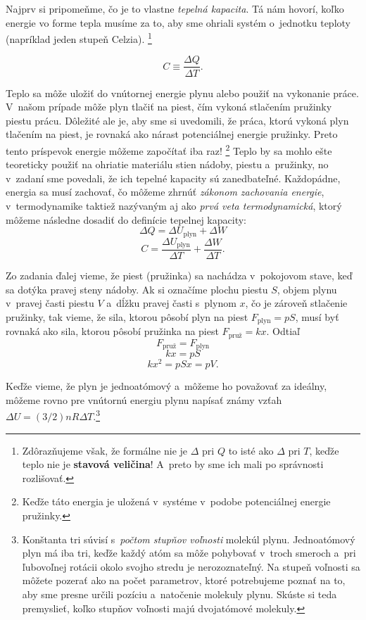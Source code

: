 Najprv si pripomeňme, čo je to vlastne \emph{tepelná kapacita}.
Tá nám hovorí, koľko energie vo forme tepla musíme  za to, aby sme ohriali systém o~jednotku teploty (napríklad jeden stupeň Celzia).%
\footnote{Zdôrazňujeme však, že formálne nie je $\Delta$ pri $Q$ to isté ako $\Delta$ pri $T$, keďže teplo nie je \textbf{stavová veličina}!
A~preto by sme ich mali po správnosti rozlišovať.}

$$C \equiv \frac{\Delta Q}{\Delta T} \text{.}$$

Teplo sa môže uložiť do vnútornej energie plynu alebo použiť na vykonanie práce. V~našom prípade môže plyn tlačiť na piest,
čím vykoná stlačením pružinky piestu prácu. Dôležité ale je, aby sme si uvedomili, že práca, ktorú vykoná plyn tlačením na
piest, je rovnaká ako nárast potenciálnej energie pružinky. Preto tento príspevok energie môžeme započítať iba raz!%
\footnote{Keďže táto energia je uložená v~systéme  v~podobe potenciálnej energie pružinky.}
Teplo by sa mohlo ešte teoreticky použiť na ohriatie materiálu stien nádoby, piestu a~pružinky, no v~zadaní sme povedali,
že ich tepelné kapacity sú zanedbateľné. Každopádne, energia sa musí zachovať, čo môžeme zhrnúť \emph{zákonom zachovania
energie}, v~termodynamike taktiež nazývaným aj ako \emph{prvá veta termodynamická}, ktorý môžeme následne dosadiť do definície
tepelnej kapacity:
$$ \Delta Q = \Delta U_{\text{plyn}} + \Delta W $$
$$C = \frac{\Delta U_{\text{plyn}}}{\Delta T} + \frac{\Delta W}{\Delta T}\text{.}$$

Zo zadania ďalej vieme, že piest (pružinka) sa nachádza v~pokojovom stave, keď sa dotýka pravej steny nádoby. Ak si označíme 
plochu piestu $S$, objem plynu v~pravej časti piestu $V$ a~dĺžku pravej časti s~plynom $x$, čo je zároveň stlačenie pružinky, tak 
vieme, že sila, ktorou pôsobí plyn na piest $F_{\text{plyn}}=pS$, musí byť rovnaká ako sila, ktorou pôsobí pružinka na piest 
$F_{\text{pruž}} = kx$. Odtiaľ
$$F_{\text{pruž}} = F_{\text{plyn}}$$
$$kx = pS$$
$$kx^2 = pSx = pV\text{.}$$

Keďže vieme, že plyn je jednoatómový a~môžeme ho považovať za ideálny, môžeme rovno pre vnútornú energiu plynu 
napísať známy vzťah $\Delta U = (3/2)nR\Delta T$.\footnote{Konštanta tri súvisí s~\emph{počtom stupňov voľnosti} molekúl plynu.
Jednoatómový plyn má iba tri, keďže každý atóm sa môže pohybovať v~troch smeroch a~pri ľubovoľnej rotácii okolo svojho stredu
je nerozoznateľný. Na stupeň voľnosti sa môžete pozerať ako na počet parametrov, ktoré potrebujeme poznať na to, aby sme
presne určili pozíciu a~natočenie molekuly plynu. Skúste si teda premyslieť, koľko stupňov voľnosti majú dvojatómové molekuly.}

